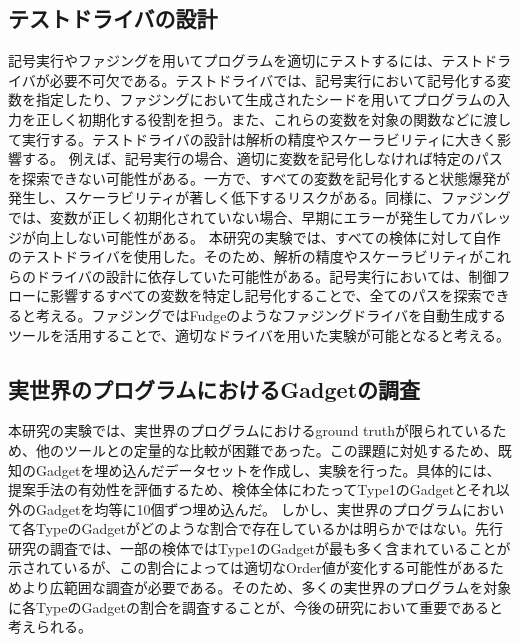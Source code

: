 \subsection{テストドライバの設計}
記号実行やファジングを用いてプログラムを適切にテストするには、テストドライバが必要不可欠である。テストドライバでは、記号実行において記号化する変数を指定したり、ファジングにおいて生成されたシードを用いてプログラムの入力を正しく初期化する役割を担う。また、これらの変数を対象の関数などに渡して実行する。テストドライバの設計は解析の精度やスケーラビリティに大きく影響する。
例えば、記号実行の場合、適切に変数を記号化しなければ特定のパスを探索できない可能性がある。一方で、すべての変数を記号化すると状態爆発が発生し、スケーラビリティが著しく低下するリスクがある。同様に、ファジングでは、変数が正しく初期化されていない場合、早期にエラーが発生してカバレッジが向上しない可能性がある。
本研究の実験では、すべての検体に対して自作のテストドライバを使用した。そのため、解析の精度やスケーラビリティがこれらのドライバの設計に依存していた可能性がある。記号実行においては、制御フローに影響するすべての変数を特定し記号化することで、全てのパスを探索できると考える。ファジングではFudge\cite{babic2019fudge}のようなファジングドライバを自動生成するツールを活用することで、適切なドライバを用いた実験が可能となると考える。

\subsection{実世界のプログラムにおけるGadgetの調査}
本研究の実験では、実世界のプログラムにおけるground truthが限られているため、他のツールとの定量的な比較が困難であった。この課題に対処するため、既知のGadgetを埋め込んだデータセットを作成し、実験を行った。具体的には、提案手法の有効性を評価するため、検体全体にわたってType1のGadgetとそれ以外のGadgetを均等に10個ずつ埋め込んだ。
しかし、実世界のプログラムにおいて各TypeのGadgetがどのような割合で存在しているかは明らかではない。先行研究\cite{oleksenko2020specfuzz}の調査では、一部の検体ではType1のGadgetが最も多く含まれていることが示されているが、この割合によっては適切なOrder値が変化する可能性があるためより広範囲な調査が必要である。そのため、多くの実世界のプログラムを対象に各TypeのGadgetの割合を調査することが、今後の研究において重要であると考えられる。

